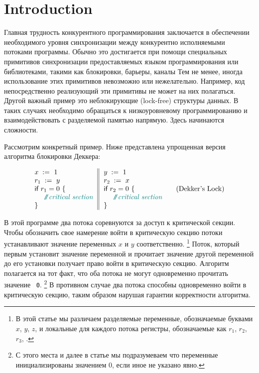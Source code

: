 \section{Introduction}
\label{sec:intro}

Главная трудность конкурентного программирования 
заключается в обеспечении необходимого уровня 
синхронизации между конкурентно исполняемыми потоками программы. 
Обычно это достигается при помощи специальных 
примитивов синхронизации предоставляемых 
языком программирования или библиотеками, 
такими как блокировки, барьеры, каналы \etc 
Тем не менее, иногда использование этих примитивов 
невозможно или нежелательно. 
Например, код непосредственно реализующий эти 
примитивы не может на них полагаться. 
Другой важный пример это неблокирующие (lock-free) структуры данных.
В таких случаях необходимо обращаться к 
низкоуровневому программированию и 
взаимодействовать с разделяемой памятью напрямую.
Здесь начинаются сложности. 

Рассмотрим конкретный пример.
Ниже представлена упрощенная версия 
алгоритма блокировки Деккера:

\begin{equation*}
\inarrII{
  \writeInst{}{x}{1} \\
  \readInst{}{r_1}{y}  \\
  \kw{if} {r_1 = 0} ~\{ \\
  ~~ \comment{critical section} \\
  \}
}{
  \writeInst{}{y}{1} \\
  \readInst{}{r_2}{x}  \\
  \kw{if} {r_2 = 0} ~\{ \\
  ~~ \comment{critical section} \\
  \}
}
\tag{Dekker's Lock}\label{ex:Dekker}
\end{equation*}

В этой программе два потока соревнуются за доступ к критической секции.
Чтобы обозначить свое намерение войти в критическую секцию
потоки устанавливают значение переменных $x$ и $y$ соответственно.%
\footnote{В этой статье мы различаем разделяемые переменные,
обозначаемые буквами $x$, $y$, $z$, и 
локальные для каждого потока регистры, 
обозначаемые как $r_1$, $r_2$, $r_3$, \etc.}
Поток, который первым установит значение переменной и 
прочитает значение другой переменной до его установки
получает право войти в критическую секцию.
Алгоритм полагается на тот факт, что оба 
потока не могут одновременно прочитать значение ~\texttt{0}.%
\footnote{С этого места и далее в статье мы подразумеваем 
что переменные инициализированы значением 0, если иное не указано явно.}
В противном случае два потока способны одновременно 
войти в критическую секцию, таким образом нарушая 
гарантии корректности алгоритма. 

